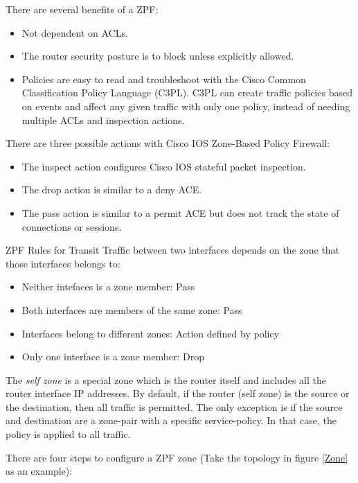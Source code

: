 There are several benefits of a ZPF:

\begin{itemize}
\item Not dependent on ACLs.
\item The router security posture is to block unless explicitly allowed.
\item Policies are easy to read and troubleshoot with the Cisco Common Classification Policy Language (C3PL). C3PL can create traffic policies based on events and affect any given traffic with only one policy, instead of needing multiple ACLs and inspection actions.
\end{itemize}

There are three possible actions with Cisco IOS Zone-Based Policy Firewall:

\begin{itemize}
  \item The inspect action configures Cisco IOS stateful packet inspection.
  \item The drop action is similar to a deny ACE.
  \item The pass action is similar to a permit ACE but does not track the state of connections or sessions.​
\end{itemize}

ZPF Rules for Transit Traffic between two interfaces depends on the zone that those interfaces belongs to:

\begin{itemize}
\item Neither intefaces is a zone member: Pass
\item Both interfaces are members of the same zone: Pass
\item Interfaces belong to different zones: Action defined by policy
\item Only one interface is a zone member: Drop
\end{itemize}

The \emph{self zone} is a special zone which is the router itself and includes all the router interface IP addresses. By default, if the router (self zone) is the source or the destination, then all traffic is permitted. The only exception is if the source and destination are a zone-pair with a specific service-policy. In that case, the policy is applied to all traffic.

There are four steps to configure a ZPF zone (Take the topology in figure \ref{Zone} as an example):

